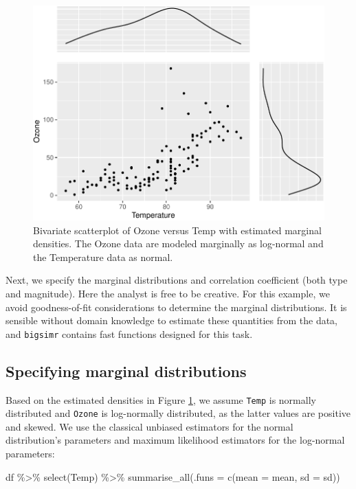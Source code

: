 \documentclass{article}
\newenvironment{Shaded}{\begin{snugshade}}{\end{snugshade}}
\newcommand{\AttributeTok}[1]{\textcolor[rgb]{0.77,0.63,0.00}{#1}}
\newcommand{\FunctionTok}[1]{\textcolor[rgb]{0.00,0.00,0.00}{#1}}
\newcommand{\NormalTok}[1]{#1}
\newcommand{\SpecialCharTok}[1]{\textcolor[rgb]{0.00,0.00,0.00}{#1}}
\begin{document}
\begin{figure}
\centering
\includegraphics{ch030-aq-joint-dist-1.pdf}
\caption{\label{fig:ch030-aq-joint-dist}Bivariate scatterplot of Ozone
versus Temp with estimated marginal densities. The Ozone data are
modeled marginally as log-normal and the Temperature data as normal.}
\end{figure}

Next, we specify the marginal distributions and correlation coefficient
(both type and magnitude). Here the analyst is free to be creative. For
this example, we avoid goodness-of-fit considerations to determine the
marginal distributions. It is sensible without domain knowledge to
estimate these quantities from the data, and \texttt{bigsimr} contains
fast functions designed for this task.

\hypertarget{specifying-marginal-distributions}{%
\subsection{Specifying marginal
distributions}\label{specifying-marginal-distributions}}

Based on the estimated densities in Figure
\ref{fig:ch030-aq-joint-dist}, we assume \texttt{Temp} is normally
distributed and \texttt{Ozone} is log-normally distributed, as the
latter values are positive and skewed. We use the classical unbiased
estimators for the normal distribution's parameters and maximum
likelihood estimators for the log-normal parameters:

\begin{Shaded}
\begin{Highlighting}[]
\NormalTok{df }\SpecialCharTok{\%\textgreater{}\%} \FunctionTok{select}\NormalTok{(Temp) }\SpecialCharTok{\%\textgreater{}\%} 
  \FunctionTok{summarise\_all}\NormalTok{(}\AttributeTok{.funs =} \FunctionTok{c}\NormalTok{(}\AttributeTok{mean =}\NormalTok{ mean, }\AttributeTok{sd =}\NormalTok{ sd))}
\end{Highlighting}
\end{Shaded}
\end{document}
